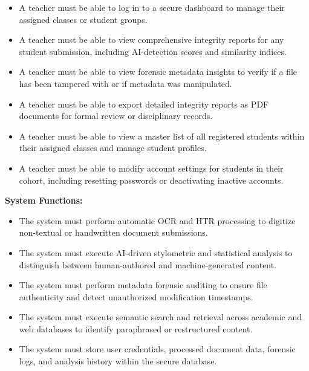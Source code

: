 \documentclass[12pt, a4paper]{report}
\numberwithin{equation}{chapter}
\begin{document}
\begin{itemize}

\item A teacher must be able to log in to a secure dashboard to manage their assigned classes or student groups.

\item A teacher must be able to view comprehensive integrity reports for any student submission, including AI-detection scores and similarity indices.

\item A teacher must be able to view forensic metadata insights to verify if a file has been tampered with or if metadata was manipulated.

\item A teacher must be able to export detailed integrity reports as PDF documents for formal review or disciplinary records.

\item A teacher must be able to view a master list of all registered students within their assigned classes and manage student profiles.

\item A teacher must be able to modify account settings for students in their cohort, including resetting passwords or deactivating inactive accounts.

\end{itemize}

\textbf{System Functions:}

\begin{itemize}

\item The system must perform automatic OCR and HTR processing to digitize non-textual or handwritten document submissions.

\item The system must execute AI-driven stylometric and statistical analysis to distinguish between human-authored and machine-generated content.

\item The system must perform metadata forensic auditing to ensure file authenticity and detect unauthorized modification timestamps.

\item The system must execute semantic search and retrieval across academic and web databases to identify paraphrased or restructured content.

\item The system must store user credentials, processed document data, forensic logs, and analysis history within the secure database.

\end{itemize}
\end{document}
